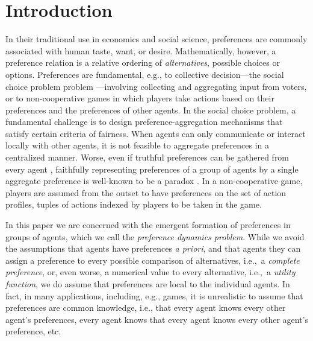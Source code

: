\documentclass[conference]{ieeeconf}
\begin{document}

\section{Introduction}

In their traditional use in economics and social science, preferences are commonly associated with human taste, want, or desire. Mathematically, however, a preference relation is a relative ordering of \emph{alternatives}, possible choices or options. Preferences are fundamental, e.g., to collective decision---the social choice problem problem \cite{munger2015}---involving collecting and aggregating input from voters, or to non-cooperative games\cite{osborne1994} in which players take actions based on their preferences and the preferences of other agents. In the social choice problem, a fundamental challenge is to design preference-aggregation mechanisms that satisfy certain criteria of fairness. When agents can only communicate or interact locally with other agents, it is not feasible to aggregate preferences in a centralized manner. Worse, even if truthful preferences can be gathered from every agent \cite{gibbard1973,satterthwaite1975}, faithfully representing preferences of a group of agents by a single aggregate preference is well-known to be a paradox \cite{arrow2012}. In a non-cooperative game, players are assumed from the outset to have preferences on the set of action profiles, tuples of actions indexed by players to be taken in the game. 
 
In this paper we are concerned with the emergent formation of preferences in groups of agents, which we call the \emph{preference dynamics problem}.
While we avoid the assumptions that agents have preferences \emph{a priori}, and that agents they can assign a preference to every possible comparison of alternatives, i.e.,~a \emph{complete preference}, or, even worse, a numerical value to every alternative, i.e.,~a \emph{utility function}, we do assume that preferences are local to the individual agents. In fact, in many applications, including, e.g., games, it is unrealistic to assume that preferences are common knowledge, i.e., that every agent knows every other agent's preferences, every agent knows that every agent knows every other agent's preference, etc.
  
\end{document}
